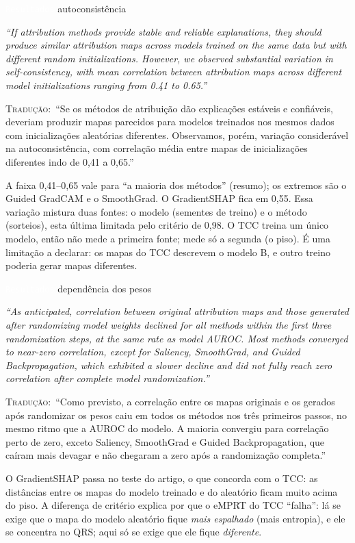 \documentclass[11pt,a4paper]{article}
\newcommand{\pagechip}[1]{{\setlength{\fboxsep}{1.5pt}\colorbox{cAcc}{\textcolor{white}{\scriptsize\texttt{#1}}}}}
\newenvironment{origquote}{\par\itshape\small}{\par}
\newenvironment{tradquote}{\par\small\textsc{Tradução:}\ }{\par}
\newcommand{\explab}[1]{\par\smallskip{\small\color{cAcc}\textbf{\MakeUppercase{#1}}}\par}
\begin{document}
\begin{citacard}{\pagechip{Resultados} autoconsistência}
\begin{origquote}“If attribution methods provide stable and reliable explanations, they should produce similar attribution maps across models trained on the same data but with different random initializations. However, we observed substantial variation in self-consistency, with mean correlation between attribution maps across different model initializations ranging from 0.41 to 0.65.”\end{origquote}
\begin{tradquote}“Se os métodos de atribuição dão explicações estáveis e confiáveis, deveriam produzir mapas parecidos para modelos treinados nos mesmos dados com inicializações aleatórias diferentes. Observamos, porém, variação considerável na autoconsistência, com correlação média entre mapas de inicializações diferentes indo de 0,41 a 0,65.”\end{tradquote}
\explab{Explicação}
A faixa 0,41--0,65 vale para “a maioria dos métodos” (resumo); os extremos são o Guided GradCAM e o SmoothGrad. O GradientSHAP fica em 0,55. Essa variação mistura duas fontes: o modelo (sementes de treino) e o método (sorteios), esta última limitada pelo critério de 0,98. O TCC treina um único modelo, então não mede a primeira fonte; mede só a segunda (o piso). É uma limitação a declarar: os mapas do TCC descrevem o modelo B, e outro treino poderia gerar mapas diferentes.
\end{citacard}

\begin{citacard}{\pagechip{Resultados} dependência dos pesos}
\begin{origquote}“As anticipated, correlation between original attribution maps and those generated after randomizing model weights declined for all methods within the first three randomization steps, at the same rate as model AUROC. Most methods converged to near-zero correlation, except for Saliency, SmoothGrad, and Guided Backpropagation, which exhibited a slower decline and did not fully reach zero correlation after complete model randomization.”\end{origquote}
\begin{tradquote}“Como previsto, a correlação entre os mapas originais e os gerados após randomizar os pesos caiu em todos os métodos nos três primeiros passos, no mesmo ritmo que a AUROC do modelo. A maioria convergiu para correlação perto de zero, exceto Saliency, SmoothGrad e Guided Backpropagation, que caíram mais devagar e não chegaram a zero após a randomização completa.”\end{tradquote}
\explab{Explicação}
O GradientSHAP passa no teste do artigo, o que concorda com o TCC: as distâncias entre os mapas do modelo treinado e do aleatório ficam muito acima do piso. A diferença de critério explica por que o eMPRT do TCC “falha”: lá se exige que o mapa do modelo aleatório fique \textit{mais espalhado} (mais entropia), e ele se concentra no QRS; aqui só se exige que ele fique \textit{diferente}.
\end{citacard}
\end{document}
